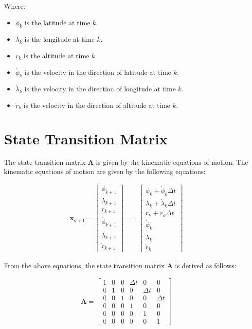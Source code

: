 Where:
\begin{itemize}
    \item $\phi_k$ is the latitude at time $k$.
    \item $\lambda_k$ is the longitude at time $k$.
    \item $r_k$ is the altitude at time $k$.
    \item $\dot{\phi}_k$ is the velocity in the direction of latitude at time $k$.
    \item $\dot{\lambda}_k$ is the velocity in the direction of longitude at time $k$.
    \item $\dot{r}_k$ is the velocity in the direction of altitude at time $k$.
\end{itemize}

\section{State Transition Matrix}
The state transition matrix $\mathbf{A}$ is given by the kinematic equations of motion.
The kinematic equations of motion are given by the following equations:

\begin{align}
    \mathbf{x}_{k+1} =
    \begin{bmatrix}
        \phi_{k+1}          \\
        \lambda_{k+1}       \\
        r_{k+1}             \\
        \dot{\phi}_{k+1}    \\
        \dot{\lambda}_{k+1} \\
        \dot{r}_{k+1}
    \end{bmatrix}
    &=
    \begin{bmatrix}
        \phi_k + \dot{\phi}_k\Delta t \\
        \lambda_k + \dot{\lambda}_k\Delta t \\
        r_k + \dot{r}_k\Delta t \\
        \dot{\phi}_k \\
        \dot{\lambda}_k \\
        \dot{r}_k
    \end{bmatrix}
\end{align}

From the above equations, the state transition matrix $\mathbf{A}$ is derived as follows:

\begin{align}
    \mathbf{A} =
    \begin{bmatrix}
        1 & 0 & 0 & \Delta t & 0 & 0 \\
        0 & 1 & 0 & 0 & \Delta t & 0 \\
        0 & 0 & 1 & 0 & 0 & \Delta t \\
        0 & 0 & 0 & 1 & 0 & 0 \\
        0 & 0 & 0 & 0 & 1 & 0 \\
        0 & 0 & 0 & 0 & 0 & 1
    \end{bmatrix}
\end{align}



